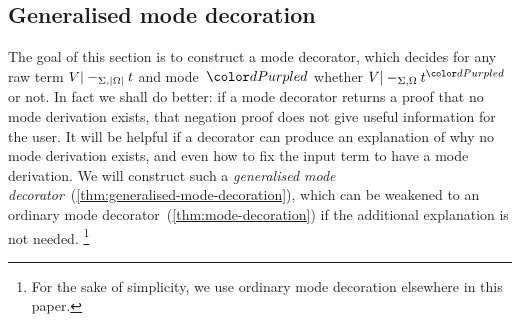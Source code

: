 %

\subsection{Generalised mode decoration}
\label{sec:mode-decoration}

The goal of this section is to construct a mode decorator, which decides for any raw term $V |-_{\Sigma,\left|\Omega\right|} t$ and mode~$\dir d$ whether $V |-_{\Sigma,\Omega} t^\dir{d}$ or not.
In fact we shall do better: if a mode decorator returns a proof that no mode derivation exists, that negation proof does not give useful information for the user.
It will be helpful if a decorator can produce an explanation of why no mode derivation exists, and even how to fix the input term to have a mode derivation.
We will construct such a \emph{generalised mode decorator}~(\cref{thm:generalised-mode-decoration}), which can be weakened to an ordinary mode decorator~(\cref{thm:mode-decoration}) if the additional explanation is not needed.%
\footnote{For the sake of simplicity, we use ordinary mode decoration elsewhere in this paper.}

